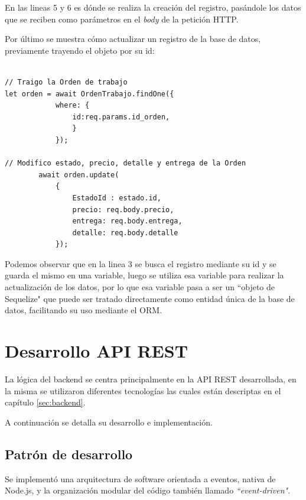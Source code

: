 En las lineas 5 y 6 es dónde se realiza la creación del registro, pasándole los datos que se reciben como parámetros en el \textit{body} de la petición HTTP.

Por último se muestra cómo actualizar un registro de la base de datos, previamente trayendo el objeto por su id:

\begin{lstlisting}[label=cod:updateregistro,caption=Código resumido para actualizar un registro en la base de datos.]

// Traigo la Orden de trabajo
let orden = await OrdenTrabajo.findOne({
            where: {
                id:req.params.id_orden,
                }
            });
            
// Modifico estado, precio, detalle y entrega de la Orden
        await orden.update(
            {
                EstadoId : estado.id,
                precio: req.body.precio,
                entrega: req.body.entrega,
                detalle: req.body.detalle
            });
\end{lstlisting}

Podemos observar que en la linea 3 se busca el registro mediante su id y se guarda el mismo en una variable, luego se utiliza esa variable para realizar la actualización de los datos, por lo que esa variable pasa a ser un ``objeto de Sequelize" que puede ser tratado directamente como entidad única de la base de datos, facilitando su uso mediante el ORM.


\section{Desarrollo API REST}
\label{sec:arquitecturaapirest}

La lógica del backend se centra principalmente en la API REST desarrollada, en la misma se utilizaron diferentes tecnologías las cuales están descriptas en el capítulo \ref{sec:backend}.

A continuación se detalla su desarrollo e implementación.

\subsection{Patrón de desarrollo}
\label{subsec:apipatron}

Se implementó una arquitectura de software orientada a eventos, nativa de Node.js, y la organización modular del código también llamado \textit{``event-driven"}.

